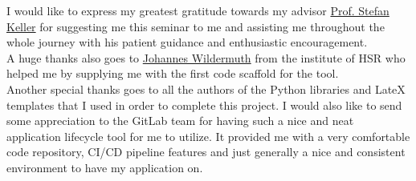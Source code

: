 I would like to express my greatest gratitude towards my advisor \href{mailto:stefan.keller@hsr.ch}{Prof. Stefan Keller} for suggesting me this seminar to me and assisting me throughout the whole journey with his patient guidance and enthusiastic encouragement. \\
\newline
A huge thanks also goes to \href{mailto:johannes.wildermuth@hsr.ch}{Johannes Wildermuth} from the institute of HSR who helped me by supplying me with the first code scaffold for the tool. \\
\newline
Another special thanks goes to all the authors of the Python libraries and LateX templates that I used in order to complete this project. I would also like to send some appreciation to the GitLab team for having such a nice and neat application lifecycle tool for me to utilize. It provided me with a very comfortable code repository, CI/CD pipeline features and just generally a nice and consistent environment to have my application on.